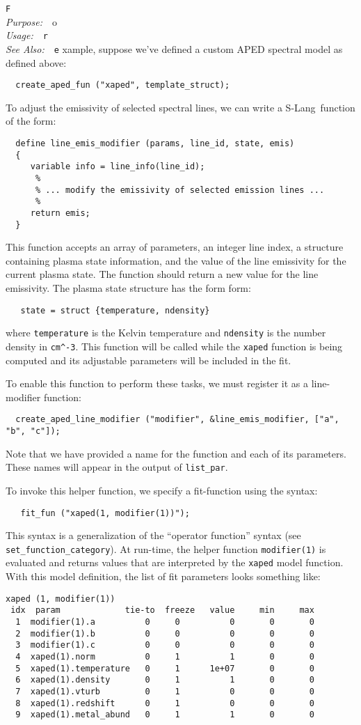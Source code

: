 \documentclass{book}
\makeatletter
\newif\ifpdf
\newcommand{\slang}{{\sc S-Lang}}
\newenvironment{isisfunction}[4]%
{\index{{#1}@{\tt #1}}%
  \ifpdf
  \else
     \addcontentsline{toc}{subsection}{{#1} -- {#2}}
  \fi
  \vbox{
          \vspace*{\baselineskip}
          {\LARGE\tt #1}\vspace*{\baselineskip}\\
          {{\it Purpose:}~~{#2}}\\
          {{\it Usage:}~~{\tt #3}}\\
          {{\it See Also:}~~{\tt #4}}
       }
}%
{ }
\makeatother
\begin{document}
{\begin{isisfunction}
For example, suppose we've defined a custom APED spectral model
as defined above:
\begin{verbatim}
  create_aped_fun ("xaped", template_struct);
\end{verbatim}

To adjust the emissivity of selected spectral lines, we can
write a \slang\ function of the form:
\begin{verbatim}
  define line_emis_modifier (params, line_id, state, emis)
  {
     variable info = line_info(line_id);
      %
      % ... modify the emissivity of selected emission lines ...
      %
     return emis;
  }
\end{verbatim}
This function accepts an array of parameters, an integer line
index, a structure containing plasma state information,
and the value of the line emissivity for the current plasma state.
The function should return a
new value for the line emissivity.
The plasma state structure has the form form:
\begin{verbatim}
   state = struct {temperature, ndensity}
\end{verbatim}
where \verb|temperature| is the Kelvin temperature and \verb|ndensity| is the
number density in \verb|cm^-3|. This function will be called while the
\verb|xaped| function is being computed and its adjustable parameters will be
included in the fit.

To enable this function to perform these tasks, we must register it as a
line-modifier function:
\begin{verbatim}
  create_aped_line_modifier ("modifier", &line_emis_modifier, ["a", "b", "c"]);
\end{verbatim}
Note that we have provided a name for the function and each of
its parameters.  These names will appear in the output of
\verb|list_par|.

To invoke this helper function, we specify a fit-function using
the syntax:
\begin{verbatim}
   fit_fun ("xaped(1, modifier(1))");
\end{verbatim}
This syntax is a generalization of the ``operator function''
syntax (see \verb|set_function_category|).  At run-time, the
helper function \verb|modifier(1)| is evaluated and returns
values that are interpreted by the \verb|xaped| model function.
With this model definition, the list of fit parameters looks
something like:
\begin{verbatim}
xaped (1, modifier(1))
 idx  param             tie-to  freeze   value     min     max
  1  modifier(1).a          0     0          0       0       0
  2  modifier(1).b          0     0          0       0       0
  3  modifier(1).c          0     0          0       0       0
  4  xaped(1).norm          0     1          1       0       0
  5  xaped(1).temperature   0     1      1e+07       0       0
  6  xaped(1).density       0     1          1       0       0
  7  xaped(1).vturb         0     1          0       0       0
  8  xaped(1).redshift      0     1          0       0       0
  9  xaped(1).metal_abund   0     1          1       0       0
\end{verbatim}


\end{isisfunction}}
\end{document}
